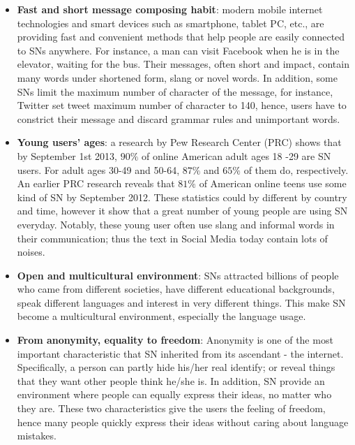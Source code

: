 \documentclass{llncs}
\begin{document}
\begin{itemize}
\item \textbf{Fast and short message composing habit}: modern mobile internet technologies and smart devices such as smartphone, tablet PC, etc., are providing fast and convenient methods that help people are easily connected to SNs anywhere. For instance, a man can visit Facebook when he is in the elevator, waiting for the bus. Their messages, often short and impact, contain many words under shortened form, slang or novel words. In addition, some SNs limit the maximum number of character of the message, for instance, Twitter set tweet maximum number of character to 140, hence, users have to constrict their message and discard grammar rules and unimportant words.

\item \textbf{Young users’ ages}: a research by Pew Research Center (PRC) shows that by September 1st 2013, $90\%$ of online American adult ages 18 -29 are SN users. For adult ages 30-49 and 50-64, $87\%$ and $65\%$ of them do, respectively. An earlier PRC research reveals that $81\%$ of American online teens use some kind of SN by September 2012. These statistics could by different by country and time, however it show that a great number of young people are using SN everyday. Notably, these young user often use slang and informal words in their communication; thus the text in Social Media today contain lots of noises.

\item \textbf{Open and multicultural environment}: SNs attracted billions of people who came from different societies, have different educational backgrounds, speak different languages and interest in very different things. This make SN become a multicultural environment, especially the language usage. 

\item \textbf{From anonymity, equality to freedom}: Anonymity is one of the most important characteristic that SN inherited from its ascendant - the internet. Specifically, a person can partly hide his/her real identify; or reveal things that they want other people think he/she is. In addition, SN provide an environment where people can equally express their ideas, no matter who they are. These two characteristics give the users the feeling of freedom, hence many people quickly express their ideas without caring about language mistakes.

\end{itemize}
\end{document}
